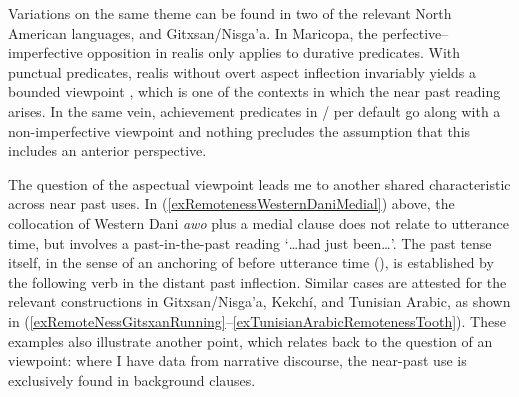 Variations on the same theme can be found in two of the relevant North American languages,  and Gitxsan/Nisga'a.  In Maricopa, the per\-fec\-tive--im\-per\-fec\-tive opposition in realis  only applies to durative predicates. With punctual predicates, realis  without overt aspect inflection invariably yields a bounded viewpoint \parencite[102–103]{Gordon1986}, which is one of the contexts in which the near past reading arises. In the same vein, achievement predicates in \slash{}  per default go along with a non-imperfective viewpoint \parencite{JohansdottirMatthewson2007} and nothing precludes the assumption that this includes an anterior perspective.

The question of the aspectual viewpoint leads me to another shared characteristic across near past uses. In (\ref{exRemotenessWesternDaniMedial}) above, the collocation of Western Dani \textit{awo} plus a medial clause does not relate to utterance time, but involves a past-in-the-past reading  \lq …had just been…\rq{}. The past tense itself, in the sense of an anchoring of  before utterance time (), is established by the following verb in the distant past inflection. Similar cases are attested for the relevant constructions in Gitxsan/Nisga'a, Kekchí, and Tunisian Arabic, as shown in  (\ref{exRemoteNessGitsxanRunning}–\ref{exTunisianArabicRemotenessTooth}). These examples also illustrate another point, which relates back to the question of an  viewpoint: where I have data from narrative discourse, the near-past use is exclusively found in background clauses.

